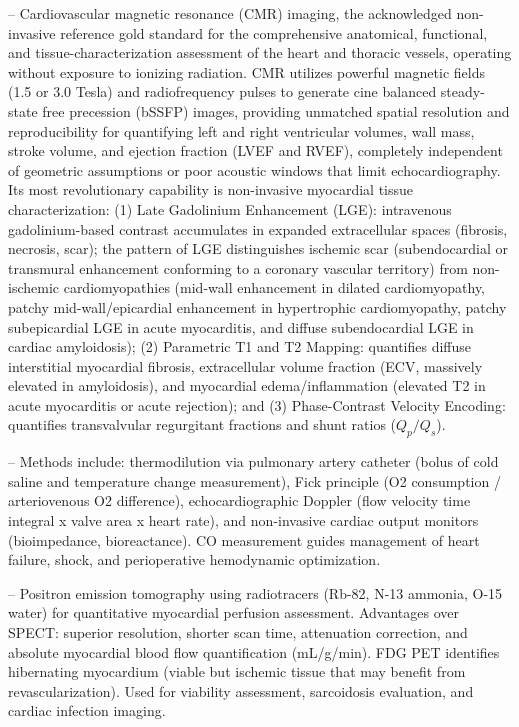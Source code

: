 -- Cardiovascular magnetic resonance (CMR) imaging, the acknowledged non-invasive reference gold standard for the comprehensive anatomical, functional, and tissue-characterization assessment of the heart and thoracic vessels, operating without exposure to ionizing radiation. CMR utilizes powerful magnetic fields (1.5 or 3.0 Tesla) and radiofrequency pulses to generate cine balanced steady-state free precession (bSSFP) images, providing unmatched spatial resolution and reproducibility for quantifying left and right ventricular volumes, wall mass, stroke volume, and ejection fraction (LVEF and RVEF), completely independent of geometric assumptions or poor acoustic windows that limit echocardiography. Its most revolutionary capability is non-invasive myocardial tissue characterization: (1) Late Gadolinium Enhancement (LGE): intravenous gadolinium-based contrast accumulates in expanded extracellular spaces (fibrosis, necrosis, scar); the pattern of LGE distinguishes ischemic scar (subendocardial or transmural enhancement conforming to a coronary vascular territory) from non-ischemic cardiomyopathies (mid-wall enhancement in dilated cardiomyopathy, patchy mid-wall/epicardial enhancement in hypertrophic cardiomyopathy, patchy subepicardial LGE in acute myocarditis, and diffuse subendocardial LGE in cardiac amyloidosis); (2) Parametric T1 and T2 Mapping: quantifies diffuse interstitial myocardial fibrosis, extracellular volume fraction (ECV, massively elevated in amyloidosis), and myocardial edema/inflammation (elevated T2 in acute myocarditis or acute rejection); and (3) Phase-Contrast Velocity Encoding: quantifies transvalvular regurgitant fractions and shunt ratios ($Q_p/Q_s$).

-- Methods include: thermodilution via pulmonary artery catheter (bolus of cold saline and temperature change measurement), Fick principle (O2 consumption / arteriovenous O2 difference), echocardiographic Doppler (flow velocity time integral x valve area x heart rate), and non-invasive cardiac output monitors (bioimpedance, bioreactance). CO measurement guides management of heart failure, shock, and perioperative hemodynamic optimization.

-- Positron emission tomography using radiotracers (Rb-82, N-13 ammonia, O-15 water) for quantitative myocardial perfusion assessment. Advantages over SPECT: superior resolution, shorter scan time, attenuation correction, and absolute myocardial blood flow quantification (mL/g/min). FDG PET identifies hibernating myocardium (viable but ischemic tissue that may benefit from revascularization). Used for viability assessment, sarcoidosis evaluation, and cardiac infection imaging.

